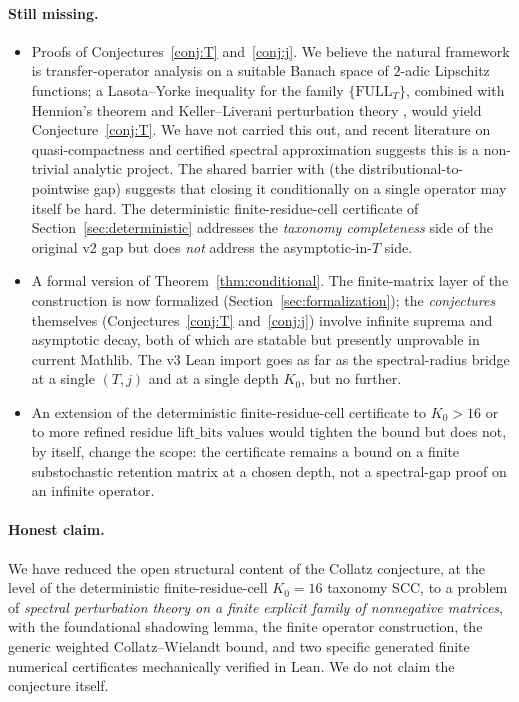 \documentclass[11pt,a4paper]{article}
\theoremstyle{definition}
\newcommand{\full}{\mathrm{FULL}}
\begin{document}
\paragraph{Still missing.}
\begin{itemize}
  \item Proofs of Conjectures~\ref{conj:T} and~\ref{conj:j}. We
        believe the natural framework is transfer-operator analysis
        on a suitable Banach space of $2$-adic Lipschitz functions;
        a Lasota--Yorke inequality for the family
        $\{\full_T\}$, combined with Hennion's theorem and
        Keller--Liverani perturbation theory \cite{kellerliverani},
        would yield Conjecture~\ref{conj:T}. We have not carried
        this out, and recent literature on quasi-compactness
        \cite{quasicompact} and certified spectral approximation
        \cite{certifiedspectral} suggests this is a non-trivial
        analytic project. The shared barrier with
        \cite[Sect.~9]{chang2026} (the distributional-to-pointwise
        gap) suggests that closing it conditionally on a single
        operator may itself be hard. The deterministic
        finite-residue-cell certificate of
        Section~\ref{sec:deterministic} addresses the
        \emph{taxonomy completeness} side of the original v2 gap
        but does \emph{not} address the asymptotic-in-$T$ side.
  \item A formal version of Theorem~\ref{thm:conditional}. The
        finite-matrix layer of the construction is now formalized
        (Section~\ref{sec:formalization}); the
        \emph{conjectures} themselves
        (Conjectures~\ref{conj:T} and~\ref{conj:j}) involve
        infinite suprema and asymptotic decay, both of which are
        statable but presently unprovable in current Mathlib. The
        v3 Lean import goes as far as the spectral-radius bridge
        at a single $(T, j)$ and at a single depth $K_0$, but no
        further.
  \item An extension of the deterministic finite-residue-cell
        certificate to $K_0 > 16$ or to more refined residue
        $\mathrm{lift\_bits}$ values would tighten the bound but
        does not, by itself, change the scope: the certificate
        remains a bound on a finite substochastic retention
        matrix at a chosen depth, not a spectral-gap proof on an
        infinite operator.
\end{itemize}

\paragraph{Honest claim.}
We have reduced the open structural content of the Collatz
conjecture, at the level of the deterministic finite-residue-cell
$K_0 = 16$ taxonomy SCC, to a problem of \emph{spectral
perturbation theory on a finite explicit family of nonnegative
matrices}, with the foundational shadowing lemma, the finite
operator construction, the generic weighted Collatz--Wielandt
bound, and two specific generated finite numerical certificates
mechanically verified in Lean. We do not claim the conjecture
itself.
\end{document}
